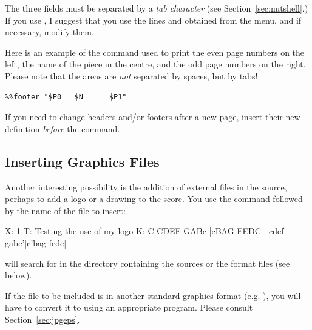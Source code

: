 \documentclass[a4paper,12pt]{book}
\begin{document}
The three fields must be separated by a \emph{tab character} (see
Section~\ref{sec:nutshell}.) If you use \jedabc{}, I suggest that you
use the lines  and  obtained from the
 menu, and if necessary,
modify them.

Here is an example of the command  used to print the
even page numbers on the left, the name of the piece in the centre,
and the odd page numbers on the right. Please note that the areas are
\emph{not} separated by spaces, but by tabs!

\begin{verbatim}
%%footer "$P0   $N      $P1"
\end{verbatim}

\begin{note}

  If you need to change headers and/or footers after a new page, insert
  their new definition \emph{before} the  command.

\end{note}


\subsection{Inserting Graphics Files}

Another interesting possibility is the addition of external
 files in the source, perhaps to add a logo or a drawing to
the score. You use the  command followed by the name of
the file to insert:

\begin{abcsource}
X: 1
T: Testing the use of my logo
K: C
CDEF GABc |cBAG FEDC |
cdef gabc'|c'bag fedc|
\end{abcsource}


\abcm{} will search for  in the directory containing
the  sources or the format files (see below).

If the file to be included is in another standard graphics format
(e.g. ), you will have to convert it to  using
an appropriate program. Please consult Section~\ref{sec:jpgeps}.
\end{document}
